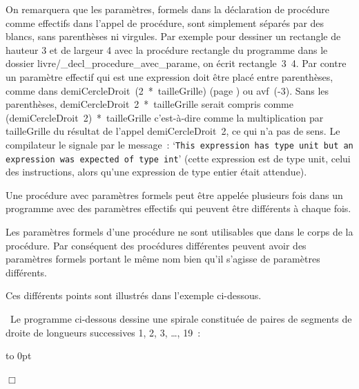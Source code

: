 On remarquera que les paramètres, formels dans la déclaration de procédure comme effectifs
dans l'appel de procédure, sont simplement séparés par des blancs, sans parenthèses ni
virgules. Par exemple pour dessiner un rectangle de hauteur 3 et de largeur 4 avec la 
procédure {\idt rectangle} du programme dans le dossier 
{\idt livre/\_decl\_procedure\_avec\_parame}, on écrit {\idt rectangle\ 3\ 4}.
Par contre un paramètre effectif qui est une expression doit être placé entre parenthèses,
comme dans {\idt demiCercleDroit\ (2\ *\ tailleGrille)} (page \pageref{prog:HeliceEnCouleur})
ou {\idt avf\ (-3)}. Sans les parenthèses, {\idt demiCercleDroit\ 2\ *\ tailleGrille} serait
compris comme {\idt (demiCercleDroit\ 2)\ *\ tailleGrille} c'est-à-dire comme la 
multiplication par {\idt tailleGrille} du résultat de l'appel {\idt demiCercleDroit\ 2}, 
ce qui n'a pas de sens. Le compilateur le signale par le message~:
`{\tt This expression has type unit but an expression was expected of type int}'
(cette expression est de type {\idt unit}, celui des instructions, alors qu'une 
expression de type entier était attendue).


Une procédure avec 
paramètres formels peut être appelée plusieurs fois dans un programme avec des 
pa\-ra\-mè\-tres effectifs
qui peuvent être différents à chaque fois.

Les paramètres formels d'une procédure ne sont utilisables que dans le
corps de la procédure. Par conséquent des procédures différentes peuvent avoir des
paramètres formels portant le même nom bien qu'il s'agisse de paramètres différents. 

Ces différents 
points sont illustrés dans l'exemple ci-dessous.

\begin{exemple}{\rm
~Le programme ci-dessous dessine une spirale constituée de paires de segments de droite
de longueurs successives 1, 2, 3, \ldots, 19~:

\newpage
 {\raggedright 
 \mbox{}\hspace*{40mm}\vbox to 0pt{\vspace*{\baselineskip}\vspace*{4cm}
}
 
 }
\noindent $\Box$ }
\end{exemple}


